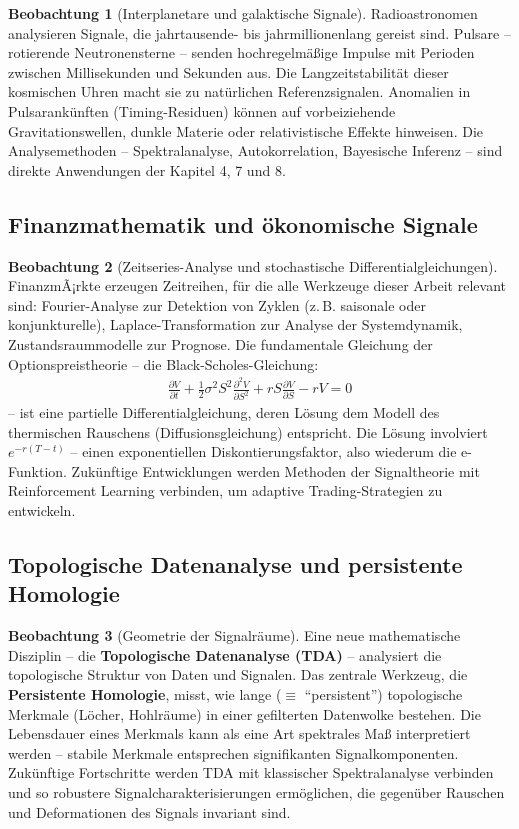 ﻿\documentclass[a4paper,12pt]{report}
\theoremstyle{definition}
\newtheorem{beobachtung}{Beobachtung}
\begin{document}
	\begin{beobachtung}[Interplanetare und galaktische Signale]
		Radioastronomen analysieren Signale, die jahrtausende- bis jahrmillionenlang gereist sind. Pulsare -- rotierende Neutronensterne -- senden hochregelmäßige Impulse mit Perioden zwischen Millisekunden und Sekunden aus. Die Langzeitstabilität dieser kosmischen Uhren macht sie zu natürlichen Referenzsignalen. Anomalien in Pulsarankünften (Timing-Residuen) können auf vorbeiziehende Gravitationswellen, dunkle Materie oder relativistische Effekte hinweisen. Die Analysemethoden -- Spektralanalyse, Autokorrelation, Bayesische Inferenz -- sind direkte Anwendungen der Kapitel 4, 7 und 8.
	\end{beobachtung}
	
	\subsection{Finanzmathematik und ökonomische Signale}
	
	\begin{beobachtung}[Zeitseries-Analyse und stochastische Differentialgleichungen]
		FinanzmÃ¡rkte erzeugen Zeitreihen, für die alle Werkzeuge dieser Arbeit relevant sind: Fourier-Analyse zur Detektion von Zyklen (z.\,B. saisonale oder konjunkturelle), Laplace-Transformation zur Analyse der Systemdynamik, Zustandsraummodelle zur Prognose. Die fundamentale Gleichung der Optionspreistheorie -- die Black-Scholes-Gleichung:
		\begin{align}
			\frac{\partial V}{\partial t} + \frac{1}{2}\sigma^2 S^2 \frac{\partial^2 V}{\partial S^2} + rS \frac{\partial V}{\partial S} - rV = 0
		\end{align}
		-- ist eine partielle Differentialgleichung, deren Lösung dem Modell des thermischen Rauschens (Diffusionsgleichung) entspricht. Die Lösung involviert $e^{-r(T-t)}$ -- einen exponentiellen Diskontierungsfaktor, also wiederum die e-Funktion. Zukünftige Entwicklungen werden Methoden der Signaltheorie mit Reinforcement Learning verbinden, um adaptive Trading-Strategien zu entwickeln.
	\end{beobachtung}
	
	\subsection{Topologische Datenanalyse und persistente Homologie}
	
	\begin{beobachtung}[Geometrie der Signalräume]
		Eine neue mathematische Disziplin -- die \textbf{Topologische Datenanalyse (TDA)} -- analysiert die topologische Struktur von Daten und Signalen. Das zentrale Werkzeug, die \textbf{Persistente Homologie}, misst, wie lange ($\equiv$ ``persistent'') topologische Merkmale (Löcher, Hohlräume) in einer gefilterten Datenwolke bestehen. Die Lebensdauer eines Merkmals kann als eine Art spektrales Maß interpretiert werden -- stabile Merkmale entsprechen signifikanten Signalkomponenten. Zukünftige Fortschritte werden TDA mit klassischer Spektralanalyse verbinden und so robustere Signalcharakterisierungen ermöglichen, die gegenüber Rauschen und Deformationen des Signals invariant sind.
	\end{beobachtung}
	
\end{document}
